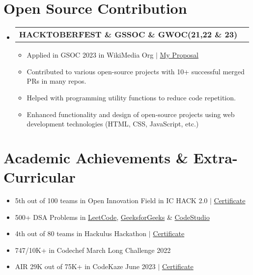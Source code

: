 \documentclass[letterpaper,11pt]{article}
\makeatletter
\newcommand{\resumeItem}[1]{
  \item\small{
    {#1 \vspace{-2pt}}
  }
}
\newcommand{\achievementItem}[1]{
  \item\small{
    {#1 \vspace{-6pt}}
  }
}
\newcommand{\resumeProjectHeading}[2]{
    \item
    \begin{tabular*}{1.001\textwidth}{l@{\extracolsep{\fill}}r}
      \small#1 & \textbf{\small #2} \\
    \end{tabular*}\vspace{-7pt}
}
\newcommand{\resumeSubHeadingListStart}{\begin{itemize}[leftmargin=0.0in, label={}]}
\newcommand{\resumeSubHeadingListEnd}{\end{itemize}}
\newcommand{\resumeItemListStart}{\justify \begin{itemize} \vspace{-4pt}}
\newcommand{\resumeItemListEnd}{\end{itemize}\vspace{-1pt}}
\makeatother
\begin{document}
\section{Open Source Contribution}
    \vspace{-2pt}
    \resumeSubHeadingListStart
        \resumeProjectHeading
            {\textbf{HACKTOBERFEST \& GSSOC \& GWOC(21,22 \& 23)}}{}
            \resumeItemListStart
                \resumeItem{Applied in GSOC 2023 in WikiMedia Org $|$ \href{https://drive.google.com/file/d/1IqJIXQrejbJIcjW4Dsw8XEoECDTCQe7H/view?usp=sharing}{My Proposal}}
                \resumeItem{Contributed to various open-source projects with 10+ successful merged PRs in many repos.}
                \resumeItem{Helped with programming utility functions to reduce code repetition.}
                \resumeItem{Enhanced functionality and design of open-source projects using web development technologies (HTML, CSS, JavaScript, etc.)}
            \resumeItemListEnd
    \resumeSubHeadingListEnd


\section{Academic Achievements \& Extra-Curricular}

\begin{itemize}[leftmargin=0.2in]
  \achievementItem{5th out of 100 teams in Open Innovation Field in IC HACK 2.0 $|$ \href{https://drive.google.com/file/d/1SeL0qU6O4hFTnG8Ef7F7ifKkHy5lRoSG/view?usp=sharing}{Certificate}}
  \achievementItem{500+ DSA Problems in \href{https://leetcode.com/tarunbisht-24/}{LeetCode}, \href{https://auth.geeksforgeeks.org/user/tarunbisht24}{GeeksforGeeks} \& \href{https://www.codingninjas.com/codestudio/profile/a5f5fd68-00b2-4d69-99c9-bfdcee24eee2}{CodeStudio}}
  \achievementItem{4th out of 80 teams in Hackulus Hackathon $|$ \href{https://drive.google.com/file/d/18ciyyMktMdTX3gtiTdu328mGsj4R-QYG/view?usp=sharing}{Certificate}}
  \achievementItem{747/10K+ in Codechef March Long Challenge 2022}
  \achievementItem{AIR 29K out of 75K+ in CodeKaze June 2023 $|$ \href{https://drive.google.com/file/d/1mMD2lqFVsxjVfZL1JmhHwPu7hafmTqpd/view?usp=sharing}{Certificate}}
\end{itemize}
\end{document}

